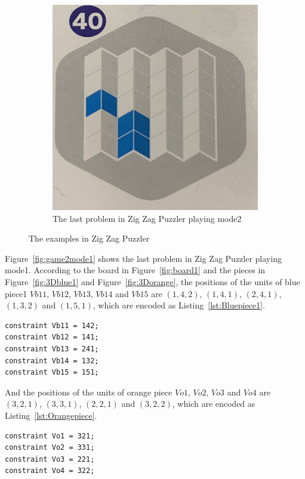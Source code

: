 \begin{figure}[htbp]
\begin{subfigure}[b]{.45\textwidth}
      \includegraphics[width=\textwidth]{figs/mode2.jpg}
    \caption{The last problem in Zig Zag Puzzler playing mode2}
    \label{fig:game2mode2}
     \end{subfigure}
     \caption{The examples in Zig Zag Puzzler}
     \label{fig:exampleszigzag}
\end{figure}
Figure~\ref{fig:game2mode1} shows the last problem in Zig Zag Puzzler playing mode1. According to the board in Figure~\ref{fig:board1} and the pieces in Figure~\ref{fig:3Dblue1} and Figure~\ref{fig:3Dorange}, the positions of the units of blue piece1 $Vb11$, $Vb12$, $Vb13$, $Vb14$ and $Vb15$ are $(1,4,2)$, $(1,4,1)$, $(2,4,1)$, $(1,3,2)$ and $(1,5,1)$, which are encoded as Listing~\ref{lst:Bluepiece1}.
\begin{lstlisting}[language=minizinc,numbers=none,caption={Encoding for blue piece1's position of last problem in playing mode1},label={lst:Bluepiece1}]
constraint Vb11 = 142;
constraint Vb12 = 141;
constraint Vb13 = 241;
constraint Vb14 = 132;
constraint Vb15 = 151;
\end{lstlisting}
\bigskip
\smallbreak
And the positions of the units of orange piece $Vo1$, $Vo2$, $Vo3$ and $Vo4$ are $(3,2,1)$, $(3,3,1)$, $(2,2,1)$ and $(3,2,2)$, which are encoded as Listing~\ref{lst:Orangepiece}.
\begin{lstlisting}[language=minizinc,numbers=none,caption={Encoding for orange piece's position of last problem in playing mode1},label={lst:Orangepiece}]
constraint Vo1 = 321;
constraint Vo2 = 331;
constraint Vo3 = 221;
constraint Vo4 = 322;
\end{lstlisting}
